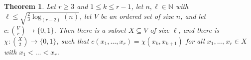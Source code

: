 \documentclass[11pt]{article}
\theoremstyle{plain}
\newtheorem{theorem}{Theorem}[section]
\begin{document}

\begin{theorem}\label{erdos-rado}
    Let $r \geq 3$ and $1 \leq k \leq r-1$, let
    $n,\ell \in \mathbb{N}$ with 
    $\ell \leq \sqrt{\frac{2}{3}\log_{(r-2)}(n)}$, let $V$ be an ordered set of size $n$, and let 
    $c : \binom{V}{r} \rightarrow \{0,1\}$.
    Then there is a subset $X \subseteq V$ of size $\ell$, and there is $\chi: \binom{X}{2} \rightarrow \{0,1\}$, such that
    $c(x_1,\dots,x_r) = \chi(x_k,x_{k+1})$ for all $x_1,\dots,x_r \in X$ with
$x_1 < \dots < x_r$.
\end{theorem}
\end{document}
